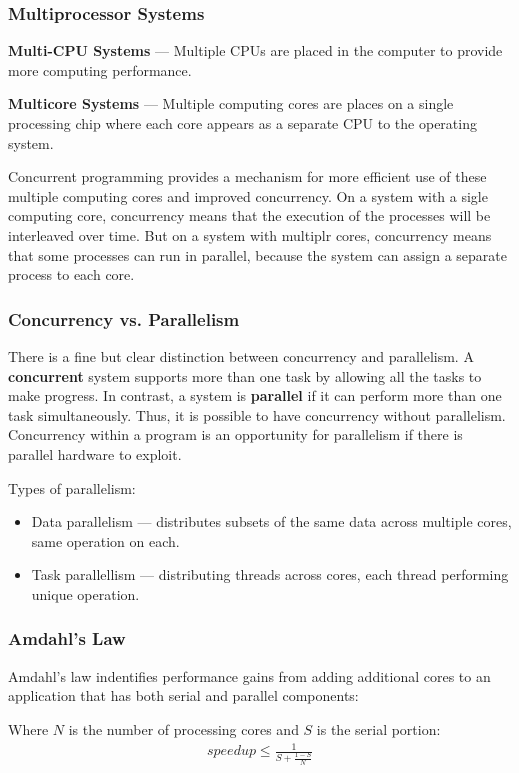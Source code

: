 \documentclass{article}%
\begin{document}
\subsubsection{Multiprocessor Systems}
\textbf{Multi-CPU Systems} --- Multiple CPUs are placed in the computer to provide more computing performance.

\textbf{Multicore Systems} --- Multiple computing cores are places on a single processing chip where each core appears as a separate CPU to the operating system.

Concurrent programming provides a mechanism for more efficient use of these multiple computing cores and improved concurrency.
On a system with a sigle computing core, concurrency means that the execution of the processes will be interleaved over time.
But on a system with multiplr cores, concurrency means that some processes can run in parallel, because the system can assign a separate process to each core.

\subsubsection{Concurrency vs. Parallelism}
There is a fine but clear distinction between concurrency and parallelism.
A \textbf{concurrent} system supports more than one task by allowing all the tasks to make progress.
In contrast, a system is \textbf{parallel} if it can perform more than one task simultaneously.
Thus, it is possible to have concurrency without parallelism.
Concurrency within a program is an opportunity for parallelism if there is parallel hardware to exploit.

Types of parallelism:
\begin{itemize}
	\item Data parallelism --- distributes subsets of the same data across multiple cores, same operation on each.
	\item Task parallellism --- distributing threads across cores, each thread performing unique operation.
\end{itemize}

\subsubsection{Amdahl's Law}
Amdahl's law indentifies performance gains from adding additional cores to an application that has both serial and parallel components:

\medskip
Where $N$ is the number of processing cores and $S$ is the serial portion:
\begin{align*}
	speedup \le \frac{1}{S+\frac{1-S}{N}}
\end{align*}
\end{document}
